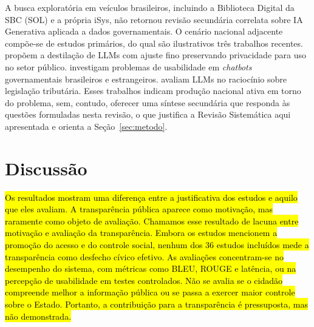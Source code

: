 \documentclass[brazilian]{sbc2025}
\newif\ifhl \hltrue
\newcommand{\rev}[1]{\ifhl\sethlcolor{yellow}\hl{#1}\else#1\fi}
\begin{document}
A busca exploratória em veículos brasileiros, incluindo a Biblioteca Digital da SBC (SOL) e a própria iSys, não retornou revisão secundária correlata sobre IA Generativa aplicada a dados governamentais. O cenário nacional adjacente compõe-se de estudos primários, do qual são ilustrativos três trabalhos recentes. \citet{Marcacini2025} propõem a destilação de LLMs com ajuste fino preservando privacidade para uso no setor público. \citet{Monteiro2023} investigam problemas de usabilidade em \textit{chatbots} governamentais brasileiros e estrangeiros. \citet{Presa2024} avaliam LLMs no raciocínio sobre legislação tributária. Esses trabalhos indicam produção nacional ativa em torno do problema, sem, contudo, oferecer uma síntese secundária que responda às questões formuladas nesta revisão, o que justifica a Revisão Sistemática aqui apresentada e orienta a Seção~\ref{sec:metodo}.





\section{Discussão}
\label{sec:discussao}
\rev{Os resultados mostram uma diferença entre a justificativa dos estudos e aquilo que eles avaliam. A transparência pública aparece como motivação, mas raramente como objeto de avaliação. Chamamos esse resultado de lacuna entre motivação e avaliação da transparência. Embora os estudos mencionem a promoção do acesso e do controle social, nenhum dos 36 estudos incluídos mede a transparência como desfecho cívico efetivo. As avaliações concentram-se no desempenho do sistema, com métricas como BLEU, ROUGE e latência, ou na percepção de usabilidade em testes controlados. Não se avalia se o cidadão compreende melhor a informação pública ou se passa a exercer maior controle sobre o Estado. Portanto, a contribuição para a transparência é pressuposta, mas não demonstrada.}
\end{document}
